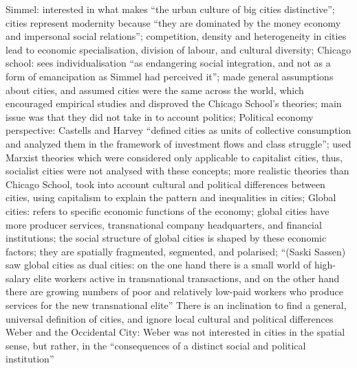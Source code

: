 \documentclass{article}
\begin{document}
\begin{outline}
	\1 Simmel: interested in what makes ``the urban culture of big cities distinctive''; cities represent modernity because ``they are dominated by the money economy and impersonal social relations''; competition, density and heterogeneity in cities lead to economic specialisation, division of labour, and cultural diversity;
	\1 Chicago school: sees individualisation ``as endangering social integration, and not as a form of emancipation as Simmel had perceived it''; made general assumptions about cities, and assumed cities were the same across the world, which encouraged empirical studies and disproved the Chicago School's theories; main issue was that they did not take in to account politics;
	\1 Political economy perspective: Castells and Harvey ``defined cities as units of collective consumption and analyzed them in the framework of investment flows and class struggle''; used Marxist theories which were considered only applicable to capitalist cities, thus, socialist cities were not analysed with these concepts; more realistic theories than Chicago School, took into account cultural and political differences between cities, using capitalism to explain the pattern and inequalities in cities;
	\1 Global cities: refers to specific economic functions of the economy; global cities have more producer services, transnational company headquarters, and financial institutions; the social structure of global cities is shaped by these economic factors; they are spatially fragmented, segmented, and polarised;
		\2 ``(Saski Sassen) saw global cities as dual cities: on the one hand there is a small world of high-salary elite workers active in transnational transactions, and on the other hand there are growing numbers of poor and relatively low-paid workers who produce services for the new transnational elite''
	\1 There is an inclination to find a general, universal definition of cities, and ignore local cultural and political differences
	\1 Weber and the Occidental City: Weber was not interested in cities in the spatial sense, but rather, in the ``consequences of a distinct social and political institution''

\end{outline}
\end{document}

